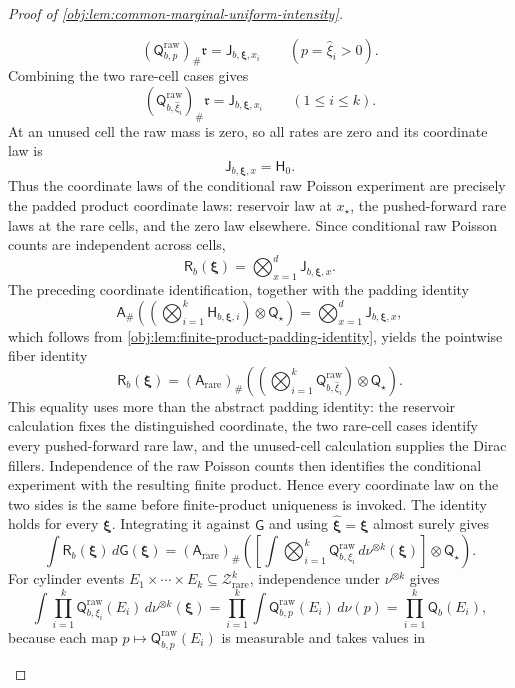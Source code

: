 \documentclass[11pt]{article}
\begin{document}
\begin{proof}[Proof of \cref{obj:lem:common-marginal-uniform-intensity}]
\begin{enumerate}
\[
(\mathsf Q^{\mathrm{raw}}_{b,p})_\#\mathfrak r
=
\mathsf J_{b,\boldsymbol\xi,x_i}
\qquad(p=\widehat\xi_i>0).
\]
Combining the two rare-cell cases gives
\[
(\mathsf Q^{\mathrm{raw}}_{b,\widehat\xi_i})_\#\mathfrak r
=
\mathsf J_{b,\boldsymbol\xi,x_i}
\qquad(1\le i\le k).
\]
At an unused cell the raw mass is zero, so all rates are zero and its coordinate law is
\[
\mathsf J_{b,\boldsymbol\xi,x}=\mathsf H_0 .
\]
Thus the coordinate laws of the conditional raw Poisson experiment are precisely the padded product coordinate laws: reservoir law at \(x_\star\), the pushed-forward rare laws at the rare cells, and the zero law elsewhere. Since conditional raw Poisson counts are independent across cells,
\[
\mathsf R_b(\boldsymbol\xi)
=
\bigotimes_{x=1}^d \mathsf J_{b,\boldsymbol\xi,x}.
\]
The preceding coordinate identification, together with the padding identity 
\[
\mathsf A_\#\left(\left(\bigotimes_{i=1}^k
\mathsf H_{b,\boldsymbol\xi,i}\right)\otimes\mathsf Q_\star\right)
=
\bigotimes_{x=1}^d \mathsf J_{b,\boldsymbol\xi,x},
\]
which follows from \cref{obj:lem:finite-product-padding-identity}, yields the pointwise fiber identity
\[
\mathsf R_b(\boldsymbol\xi)
=
(\mathsf A_{\mathrm{rare}})_\#\left(\left(\bigotimes_{i=1}^k
\mathsf Q^{\mathrm{raw}}_{b,\widehat\xi_i}\right)\otimes\mathsf Q_\star\right).
\]
This equality uses more than the abstract padding identity: the reservoir calculation fixes the
distinguished coordinate, the two rare-cell cases identify every pushed-forward rare law, and the
unused-cell calculation supplies the Dirac fillers. Independence of the raw Poisson counts then
identifies the conditional experiment with the resulting finite product. Hence every coordinate
law on the two sides is the same before finite-product uniqueness is invoked.
The identity holds for every \(\boldsymbol\xi\). Integrating it against \(\mathsf G\) and using \(\widehat{\boldsymbol\xi}=\boldsymbol\xi\) almost surely gives
\[
\int \mathsf R_b(\boldsymbol\xi)\,d\mathsf G(\boldsymbol\xi)
=
(\mathsf A_{\mathrm{rare}})_\#\left(
\left[\int \bigotimes_{i=1}^k
\mathsf Q^{\mathrm{raw}}_{b,\xi_i}\,d\nu^{\otimes k}(\boldsymbol\xi)\right]
\otimes\mathsf Q_\star\right).
\]
For cylinder events \(E_1\times\cdots\times E_k\subseteq\mathcal Z_{\mathrm{rare}}^k\), independence under \(\nu^{\otimes k}\) gives
\[
\int \prod_{i=1}^k
\mathsf Q^{\mathrm{raw}}_{b,\xi_i}(E_i)\,d\nu^{\otimes k}(\boldsymbol\xi)
=
\prod_{i=1}^k \int
\mathsf Q^{\mathrm{raw}}_{b,p}(E_i)\,d\nu(p)
=
\prod_{i=1}^k \mathsf Q_b(E_i),
\]
because each map \(p\mapsto\mathsf Q^{\mathrm{raw}}_{b,p}(E_i)\) is measurable and takes values in

\end{enumerate}
\end{proof}
\end{document}

